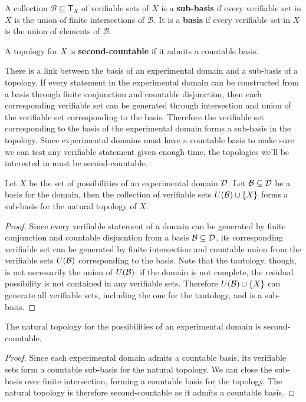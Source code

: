 \documentclass[11pt,letterpaper,fleqn]{memoir} %
\begin{document}
\begin{mathSection}
\begin{defn}
	A collection $\mathcal{B} \subseteq \mathsf{T}_X$ of verifiable sets of $X$ is a \textbf{sub-basis} if every verifiable set in $X$ is the union of finite intersections of $\mathcal{B}$. It is a \textbf{basis} if every verifiable set in $X$ is the union of elements of $\mathcal{B}$.
\end{defn}
\begin{defn}
	A topology for $X$ is \textbf{second-countable} if it admits a countable basis.
\end{defn}
\end{mathSection}

There is a link between the basis of an experimental domain and a sub-basis of a topology. If every statement in the experimental domain can be constructed from a basis through finite conjunction and countable disjunction, then each corresponding verifiable set can be generated through intersection and union of the verifiable set corresponding to the basis. Therefore the verifiable set corresponding to the basis of the experimental domain forms a sub-basis in the topology. Since experimental domains must have a countable basis to make sure we can test any verifiable statement given enough time, the topologies we'll be interested in must be second-countable.

\begin{mathSection}
	\begin{prop}
		Let $X$ be the set of possibilities of an experimental domain $\mathcal{D}$. Let $\mathcal{B} \subseteq \mathcal{D}$ be a basis for the domain, then the collection of verifiable sets $U(\mathcal{B})\cup\{X\}$ forms a sub-basis for the natural topology of $X$.
	\end{prop}
	\begin{proof}
		Since every verifiable statement of a domain can be generated by finite conjunction and countable disjucntion from a basis $\mathcal{B} \subseteq \mathcal{D}$, its corresponding verifiable set can be generated by finite intersection and countable union from the verifiable sets $U(\mathcal{B})$ corresponding to the basis. Note that the tautology, though, is not necessarily the union of $U(\mathcal{B})$: if the domain is not complete, the residual possibility is not contained in any verifiable sets. Therefore $U(\mathcal{B})\cup\{X\}$ can generate all verifiable sets, including the one for the tautology, and is a sub-basis.
	\end{proof}
	\begin{prop}
		The natural topology for the possibilities of an experimental domain is second-countable.
	\end{prop}
	\begin{proof}
		Since each experimental domain admits a countable basis, its verifiable sets form a countable sub-basis for the natural topology. We can close the sub-basis over finite intersection, forming a countable basis for the topology. The natural topology is therefore second-countable as it admits a countable basis.
\end{proof}
\end{mathSection}
\end{document}
